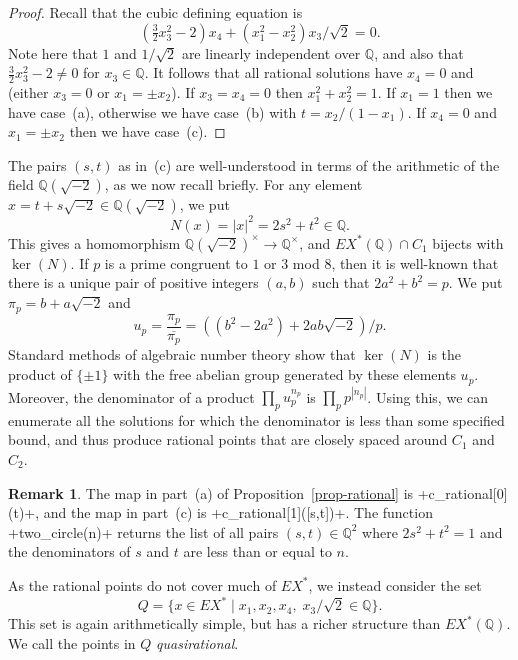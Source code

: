 \documentclass[reqno]{amsart}
\newcommand{\Q}         {{\mathbb{Q}}}
\newcommand{\ov}[1]     {\overline{#1}}
\newcommand{\st}        {\;|\;}
\newcommand{\tm}        {\times}
\newcommand{\rt}        {\sqrt{2}}
\renewcommand{\:}{\colon}
\theoremstyle{definition}
\newtheorem{remark}[theorem]{Remark}
\begin{document}
\begin{proof}
 Recall that the cubic defining equation is
 \[ (\tfrac{3}{2}x_3^2-2)x_4+(x_1^2-x_2^2)x_3/\rt = 0. \]
 Note here that $1$ and $1/\sqrt{2}$ are linearly independent over
 $\Q$, and also that $\tfrac{3}{2}x_3^2-2\neq 0$ for $x_3\in\Q$.
 It follows that all rational solutions have $x_4=0$ and (either
 $x_3=0$ or $x_1=\pm x_2$).  If $x_3=x_4=0$ then $x_1^2+x_2^2=1$.  If
 $x_1=1$ then we have case~(a), otherwise we have case~(b) with
 $t=x_2/(1-x_1)$.  If $x_4=0$ and $x_1=\pm x_2$ then we have
 case~(c).
\end{proof}

The pairs $(s,t)$ as in~(c) are well-understood in terms of the
arithmetic of the field $\Q(\sqrt{-2})$, as we now recall briefly.
For any element $x=t+s\sqrt{-2}\in\Q(\sqrt{-2})$, we put
\[ N(x) = |x|^2 = 2s^2+t^2 \in \Q. \]
This gives a homomorphism $\Q(\sqrt{-2})^\tm\to\Q^\tm$, and
$EX^*(\Q)\cap C_1$ bijects with $\ker(N)$.  If $p$ is a prime
congruent to $1$ or $3$ mod $8$, then it is well-known that there is a
unique pair of positive integers $(a,b)$ such that $2a^2+b^2=p$.  We
put $\pi_p=b+a\sqrt{-2}$ and
\[ u_p=\frac{\pi_p}{\ov{\pi_p}} = ((b^2-2a^2)+2ab\sqrt{-2})/p. \]
Standard methods of algebraic number theory show that $\ker(N)$ is the
product of $\{\pm 1\}$ with the free abelian group generated by these
elements $u_p$.  Moreover, the denominator of a product
$\prod_pu_p^{n_p}$ is $\prod_pp^{|n_p|}$.  Using this, we can
enumerate all the solutions for which the denominator is less than
some specified bound, and thus produce rational points that are
closely spaced around $C_1$ and $C_2$.

\begin{remark}
 The map in part~(a) of Proposition~\ref{prop-rational} is
 \mcode+c_rational[0](t)+, and the map in part~(c) is
 \mcode+c_rational[1]([s,t])+.  The function \mcode+two_circle(n)+
 returns the list of all pairs $(s,t)\in\Q^2$ where $2s^2+t^2=1$ and
 the denominators of $s$ and $t$ are less than or equal to $n$.
\end{remark}

As the rational points do not cover much of $EX^*$, we instead
consider the set
\[ Q = \{x\in EX^*\st x_1,x_2,x_4,\;x_3/\rt\in\Q\}. \]
This set is again arithmetically simple, but has a richer structure
than $EX^*(\Q)$.  We call the points in $Q$ \emph{quasirational}.
\end{document}
